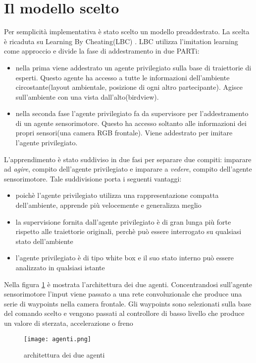 \section{Il modello scelto}
Per semplicità implementativa è stato scelto un modello preaddestrato. La scelta è ricaduta su Learning By Cheating(LBC) \cite{lbc}. LBC utilizza l'imitation learning come
approccio e divide la fase di addestramento in due PARTi: \begin{itemize}
    \item nella prima viene addestrato un agente privilegiato sulla base di traiettorie di esperti. Questo agente ha accesso a tutte le informazioni 
    dell'ambiente circostante(layout ambientale, posizione di ogni altro partecipante). Agisce sull'ambiente con una vista dall'alto(birdview).
    \item nella seconda fase l'agente privilegiato fa da supervisore per l'addestramento di un agente sensorimotore. Questo ha accesso soltanto alle informazioni dei
    propri sensori(una camera RGB frontale). Viene addestrato per imitare l'agente privilegiato.
\end{itemize}
L'apprendimento è stato suddiviso in due fasi per separare due compiti: imparare ad \emph{agire}, compito dell'agente privilegiato e imparare a \emph{vedere}, compito dell'agente sensorimotore.
Tale suddivisione porta i seguenti vantaggi:\begin{itemize}
    \item poichè l'agente privilegiato utilizza una rappresentazione compatta dell'ambiente, apprende più velocemente e generalizza meglio
    \item la supervisione fornita dall'agente privilegiato è di gran lunga più forte rispetto alle traiettorie originali, perchè può essere interrogato 
    su qualsiasi stato dell'ambiente
    \item l'agente privilegiato è di tipo white box e il suo stato interno può essere analizzato in qualsiasi istante
\end{itemize}
Nella figura \ref{fig:arch} è mostrata l'architettura dei due agenti. Concentrandosi sull'agente sensorimotore  l'input viene passato a una rete convoluzionale che produce una serie di 
waypoints nella camera frontale. Gli waypoints  sono selezionati sulla base del comando scelto e vengono passati al controllore di basso livello che produce un valore di sterzata, accelerazione o freno
\begin{figure}[h!]
    \texttt{[image: agenti.png]}
    \caption{architettura dei due agenti\cite{lbc}}
    \label{fig:arch}
\end{figure}
